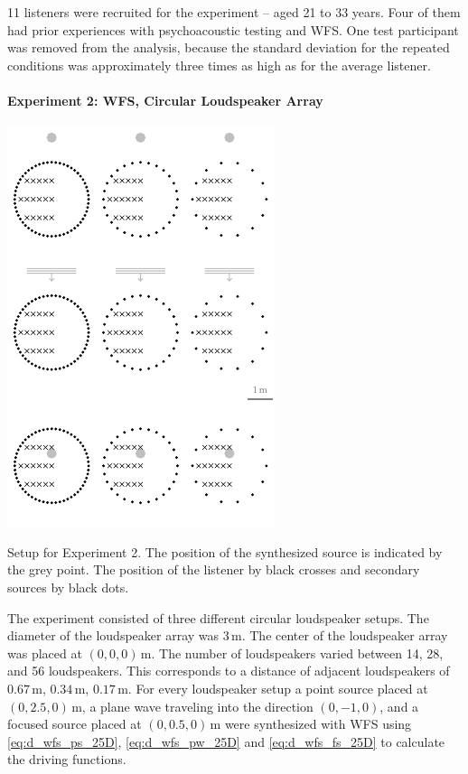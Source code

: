 11 listeners were recruited for the experiment -- aged 21 to 33 years.
Four of them had prior experiences with psychoacoustic testing and \ac{WFS}.
One test participant was removed from the analysis, because the standard
deviation for the repeated conditions was approximately three times as high as
for the average listener.


\paragraph{Experiment 2: \ac{WFS}, Circular Loudspeaker Array}
\label{sec:experiment2_wfs_circular_array}
%
\begin{marginfigure}
    \includegraphics{fig5_02/fig5_02}
    \caption{Setup for Experiment 2. The position of the synthesized
    source is indicated by the grey point. The position of the listener by black
    crosses and secondary sources by black dots.
        }
    \label{fig:setup_wfs_circular_array}
\end{marginfigure}
%
The experiment consisted of three different circular loudspeaker setups. The
diameter of the loudspeaker array was $3$\,m. The center of the
loudspeaker array was placed at $(0,0,0)$\,m. The number of loudspeakers
varied between 14, 28, and 56 loudspeakers. This corresponds to a distance
of adjacent loudspeakers of $0.67$\,m, $0.34$\,m, $0.17$\,m.
For every loudspeaker setup a point source placed at $(0,2.5,0)$\,m, a plane wave
traveling into the direction $(0,-1,0)$, and a focused source placed at $(0,0.5,0)$\,m
were synthesized with \ac{WFS} using \eqref{eq:d_wfs_ps_25D}, \eqref{eq:d_wfs_pw_25D}
and \eqref{eq:d_wfs_fs_25D} to calculate the driving functions.

